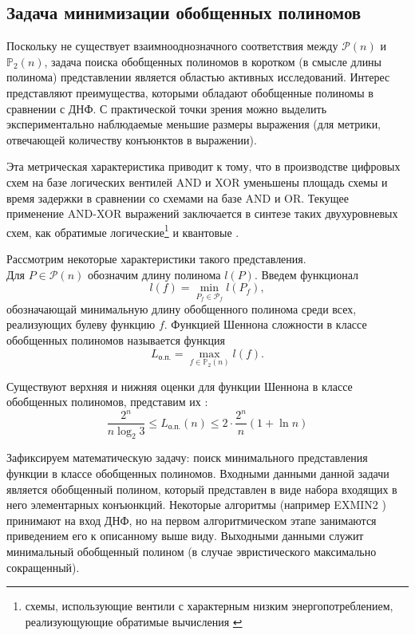 \documentclass[a4paper,12pt,titlepage,finall]{article}
\begin{document}
\subsection{Задача минимизации обобщенных полиномов}

Поскольку не существует взаимнооднозначного соответствия между $ \mathcal{P}(n) $ и $ \mathbb{P}_2(n) $, задача поиска обобщенных полиномов в коротком (в смысле длины полинома) представлении является областью активных исследований. Интерес представляют преимущества, которыми обладают обобщенные полиномы в сравнении с ДНФ. С практической точки зрения можно выделить экспериментально наблюдаемые меньшие размеры выражения \cite{exorcism4} (для метрики, отвечающей количеству конъюнктов в выражении).

Эта метрическая характеристика приводит к тому, что в производстве цифровых схем на базе логических вентилей \textsc{AND} и \textsc{XOR} уменьшены площадь схемы и время задержки \cite{delay} в сравнении со схемами на базе \textsc{AND} и \textsc{OR}. Текущее применение \textsc{AND-XOR} выражений заключается в синтезе таких двухуровневых схем, как обратимые логические\footnote{схемы, использующие вентили с характерным низким энергопотреблением, реализующующие обратимые вычисления \cite{revsynth}} \cite{reversible} и квантовые \cite{quantum}.

Рассмотрим некоторые характеристики такого представления.\\
Для $ P \in \mathcal{P}(n) $ обозначим длину полинома $ l(P) $. Введем функционал
$$ l(f) = \min\limits_{P_f \in \mathcal{P}_f} l(P_f), $$
обозначающай минимальную длину обобщенного полинома среди всех, реализующих булеву функцию $ f $. Функцией Шеннона сложности в классе обобщенных полиномов называется функция
$$ L_\text{о.п.} = \max\limits_{f \in \mathbb{P}_2(n)} l(f). $$

Существуют верхняя и нижняя оценки для функции Шеннона в классе обобщенных полиномов, представим их \cite{selezn}:
$$ \frac{2^n}{n \log_2 3} \le L_\text{о.п.}(n) \le 2 \cdot \frac{2^n}{n} (1 + \ln n) $$

Зафиксируем математическую задачу: поиск минимального представления функции в классе обобщенных полиномов. Входными данными данной задачи является обобщенный полином, который представлен в виде набора входящих в него элементарных конъюнкций. Некоторые алгоритмы (например \textsc{EXMIN2} \cite{exmin2}) принимают на вход ДНФ, но на первом алгоритмическом этапе занимаются приведением его к описанному выше виду. Выходными данными служит минимальный обобщенный полином (в случае эвристического максимально сокращенный).
\end{document}
